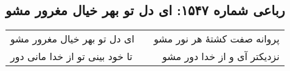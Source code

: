 \begin{center}
\section*{رباعی شماره ۱۵۴۷: ای دل تو بهر خیال مغرور مشو}
\label{sec:1547}
\begin{longtable}{l p{0.5cm} r}
ای دل تو بهر خیال مغرور مشو
&&
پروانه صفت کشتهٔ هر نور مشو
\\
تا خود بینی تو از خدا مانی دور
&&
نزدیکتر آی و از خدا دور مشو
\\
\end{longtable}
\end{center}
